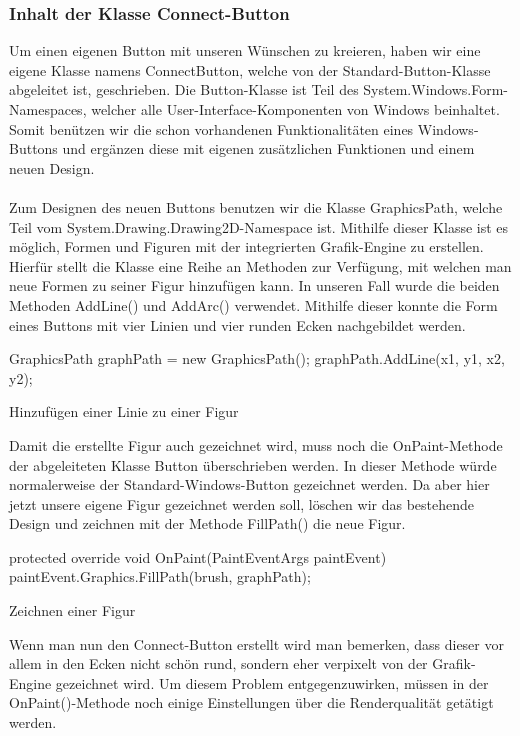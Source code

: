 \subsubsection{Inhalt der Klasse Connect-Button}

Um einen eigenen Button mit unseren Wünschen zu kreieren, haben wir eine eigene Klasse namens ConnectButton, welche von der Standard-Button-Klasse abgeleitet ist, geschrieben. Die Button-Klasse ist Teil des System.Windows.Form-Namespaces, welcher alle User-Interface-Komponenten von Windows beinhaltet. Somit benützen wir die schon vorhandenen Funktionalitäten eines Windows-Buttons und ergänzen diese mit eigenen zusätzlichen Funktionen und einem neuen Design.
\\ \ \\
Zum Designen des neuen Buttons benutzen wir die Klasse GraphicsPath, welche Teil vom System.Drawing.Drawing2D-Namespace ist. Mithilfe dieser Klasse ist es möglich, Formen und Figuren mit der integrierten Grafik-Engine zu erstellen. Hierfür stellt die Klasse eine Reihe an Methoden zur Verfügung, mit welchen man neue Formen zu seiner Figur hinzufügen kann. In unseren Fall wurde die beiden Methoden AddLine() und AddArc() verwendet. Mithilfe dieser konnte die Form eines Buttons mit vier Linien und vier runden Ecken nachgebildet werden.

\begin{program}[H]
\begin{CSharpCode}
GraphicsPath graphPath = new GraphicsPath();
graphPath.AddLine(x1, y1, x2, y2);
\end{CSharpCode}
\caption{Hinzufügen einer Linie zu einer Figur}
\end{program}
\noindent 
Damit die erstellte Figur auch gezeichnet wird, muss noch die OnPaint-Methode der abgeleiteten Klasse Button überschrieben werden. In dieser Methode würde normalerweise der Standard-Windows-Button gezeichnet werden. Da aber hier jetzt unsere eigene Figur gezeichnet werden soll, löschen wir das bestehende Design und zeichnen mit der Methode FillPath() die neue Figur.

\begin{program}[H]
\begin{CSharpCode}
protected override void OnPaint(PaintEventArgs paintEvent)
{
    paintEvent.Graphics.FillPath(brush, graphPath);
}
\end{CSharpCode}
\caption{Zeichnen einer Figur}
\end{program}
\noindent 
Wenn man nun den Connect-Button erstellt wird man bemerken, dass dieser vor allem in den Ecken nicht schön rund, sondern eher verpixelt von der Grafik-Engine gezeichnet wird. Um diesem Problem entgegenzuwirken, müssen in der OnPaint()-Methode noch einige Einstellungen über die Renderqualität getätigt werden.

